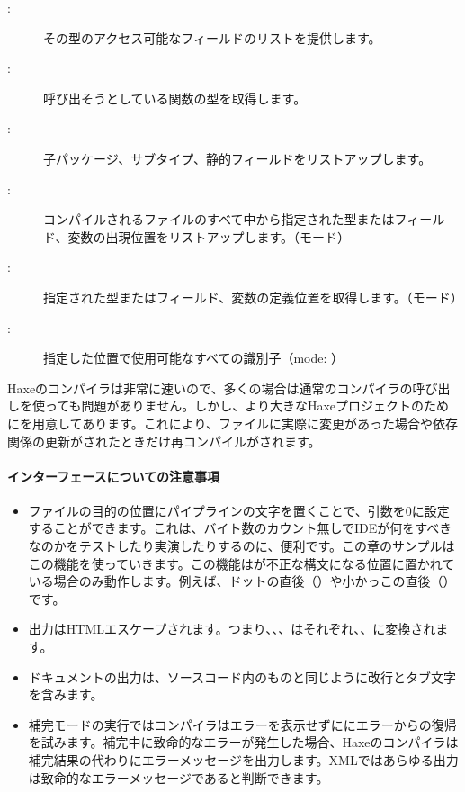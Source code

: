 \begin{description}
	\item[:] その型のアクセス可能なフィールドのリストを提供します。
	\item[:] 呼び出そうとしている関数の型を取得します。
	\item[:] 子パッケージ、サブタイプ、静的フィールドをリストアップします。
	\item[:] コンパイルされるファイルのすべて中から指定された型またはフィールド、変数の出現位置をリストアップします。（モード）
	\item[:] 指定された型またはフィールド、変数の定義位置を取得します。（モード）
	\item[:] 指定した位置で使用可能なすべての識別子（mode: ）
\end{description}

Haxeのコンパイラは非常に速いので、多くの場合は通常のコンパイラの呼び出しを使っても問題がありません。しかし、より大きなHaxeプロジェクトのためにを用意してあります。これにより、ファイルに実際に変更があった場合や依存関係の更新がされたときだけ再コンパイルがされます。

\paragraph{インターフェースについての注意事項}
\label{cr-completion-interface-notes}

\begin{itemize}
	\item ファイルの目的の位置にパイプライン\ic{|}の文字を置くことで、引数を0に設定することができます。これは、バイト数のカウント無しでIDEが何をすべきなのかをテストしたり実演したりするのに、便利です。この章のサンプルはこの機能を使っていきます。この機能は\ic{|}が不正な構文になる位置に置かれている場合のみ動作します。例えば、ドットの直後（）や小かっこの直後（\ic{(|}）です。
	\item 出力はHTMLエスケープされます。つまり、\ic{\&}、\ic{<}、\ic{>}はそれぞれ、、に変換されます。
	\item ドキュメントの出力は、ソースコード内のものと同じように改行とタブ文字を含みます。
	\item 補完モードの実行ではコンパイラはエラーを表示せずににエラーからの復帰を試みます。補完中に致命的なエラーが発生した場合、Haxeのコンパイラは補完結果の代わりにエラーメッセージを出力します。XMLではあらゆる出力は致命的なエラーメッセージであると判断できます。
\end{itemize}

